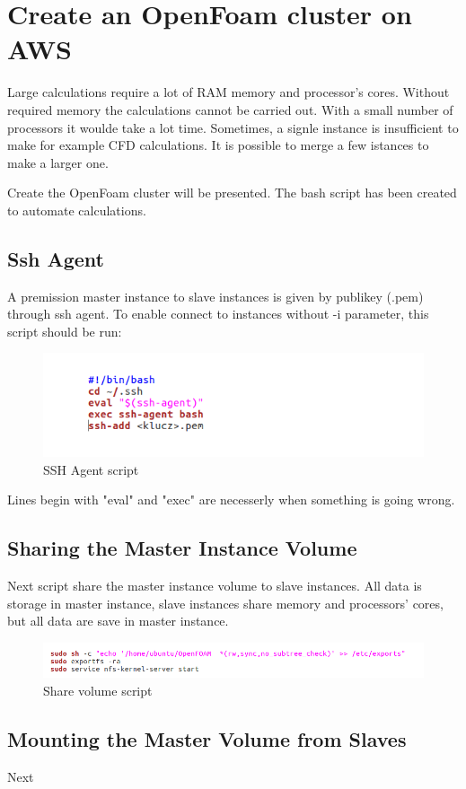 \section{Create an OpenFoam cluster on AWS}

Large calculations require a lot of RAM memory and processor's cores. Without required memory the calculations cannot be carried out. With a small number of processors it woulde take a lot time. Sometimes, a signle instance is insufficient to make for example CFD calculations. It is possible to merge a few istances to make a larger one.

Create the OpenFoam cluster will be presented. The bash script has been created to automate calculations.

\subsection{Ssh Agent}

A premission master instance to slave instances is given by publikey (.pem) through ssh agent. To enable connect to instances without -i parameter, this script should be run:

\begin{figure}[h!]
\includegraphics[width=\textwidth]{img/ssh_agent}
\caption{SSH Agent script}
\end{figure}

Lines begin with "eval" and "exec" are necesserly when something is going wrong.

\subsection{Sharing the Master Instance Volume}

Next script share the master instance volume to slave instances. All data is storage in master instance, slave instances share memory and processors' cores, but all data are save in master instance.

\begin{figure}[h!]
\includegraphics[width=\textwidth]{img/share_volume}
\caption{Share volume script}
\end{figure}

\subsection{Mounting the Master Volume from Slaves}

Next